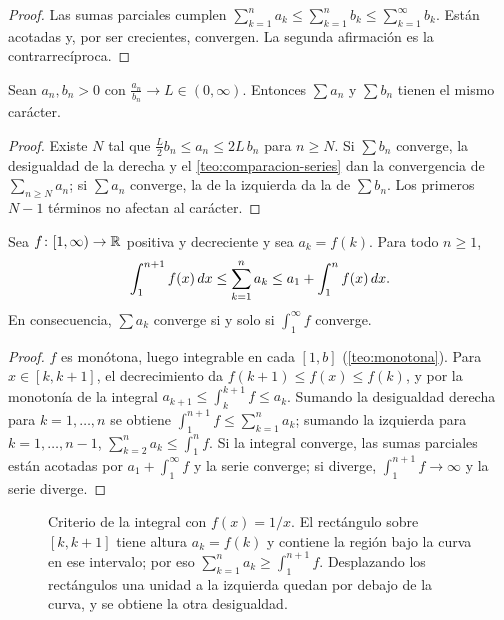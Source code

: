 \begin{proof}
Las sumas parciales cumplen $\sum_{k=1}^{n}a_k\le\sum_{k=1}^{n}b_k\le\sum_{k=1}^{\infty}b_k$. Están acotadas y, por ser crecientes, convergen. La segunda afirmación es la contrarrecíproca.
\end{proof}

\begin{teorema}\label{teo:comparacion-limite-series}
Sean $a_n,b_n>0$ con $\frac{a_n}{b_n}\to L\in(0,\infty)$. Entonces $\sum a_n$ y $\sum b_n$ tienen el mismo carácter.
\end{teorema}

\begin{proof}
Existe $N$ tal que $\frac L2b_n\le a_n\le2L\,b_n$ para $n\ge N$. Si $\sum b_n$ converge, la desigualdad de la derecha y el \cref{teo:comparacion-series} dan la convergencia de $\sum_{n\ge N}a_n$; si $\sum a_n$ converge, la de la izquierda da la de $\sum b_n$. Los primeros $N-1$ términos no afectan al carácter.
\end{proof}

\begin{teorema}\label{teo:criterio-integral}
Sea $f\colon[1,\infty)\to\mathbb{R}$ positiva y decreciente y sea $a_k=f(k)$. Para todo $n\ge1$,
\[
\int_1^{n+1}f(x)\mathop{}\!d x\le\sum_{k=1}^{n}a_k\le a_1+\int_1^{n}f(x)\mathop{}\!d x .
\]
En consecuencia, $\sum a_k$ converge si y solo si $\int_1^{\infty}f$ converge.
\end{teorema}

\begin{proof}
$f$ es monótona, luego integrable en cada $[1,b]$ (\cref{teo:monotona}). Para $x\in[k,k+1]$, el decrecimiento da $f(k+1)\le f(x)\le f(k)$, y por la monotonía de la integral $a_{k+1}\le\int_k^{k+1}f\le a_k$. Sumando la desigualdad derecha para $k=1,\dots,n$ se obtiene $\int_1^{n+1}f\le\sum_{k=1}^{n}a_k$; sumando la izquierda para $k=1,\dots,n-1$, $\sum_{k=2}^{n}a_k\le\int_1^{n}f$. Si la integral converge, las sumas parciales están acotadas por $a_1+\int_1^{\infty}f$ y la serie converge; si diverge, $\int_1^{n+1}f\to\infty$ y la serie diverge.
\end{proof}

\begin{figure}[h]
\centering
{}
\caption{Criterio de la integral con $f(x)=1/x$. El rectángulo sobre $[k,k+1]$ tiene altura $a_k=f(k)$ y contiene la región bajo la curva en ese intervalo; por eso $\sum_{k=1}^{n}a_k\ge\int_1^{n+1}f$. Desplazando los rectángulos una unidad a la izquierda quedan por debajo de la curva, y se obtiene la otra desigualdad.}
\label{fig:criterio-integral}
\end{figure}

